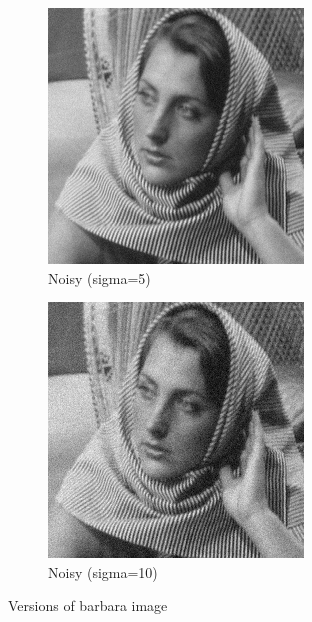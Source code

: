 \documentclass[12pt]{article}
\begin{document}
\begin{figure}[h]
\begin{subfigure}[b]{0.3\textwidth}
        \includegraphics[width=\textwidth]{../images/noisy_barbara_5.png}
        \caption{Noisy (sigma=5)}
        \label{fig:subfig2}
    \end{subfigure}
    \begin{subfigure}[b]{0.3\textwidth}
        \centering
        \includegraphics[width=\textwidth]{../images/noisy_barbara_10.png}
        \caption{Noisy (sigma=10)}
        \label{fig:subfig3}
    \end{subfigure}
    
    \caption{Versions of barbara image}
    \label{fig:overall}
\end{figure}
\end{document}
